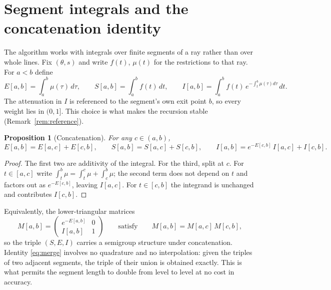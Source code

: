 \documentclass[11pt]{article}
\newtheorem{proposition}{Proposition}
\begin{document}
\section{Segment integrals and the concatenation identity}
\label{sec:identity}

The algorithm works with integrals over finite segments of a ray rather than
over whole lines. Fix $(\theta,s)$ and write $f(t)$, $\mu(t)$ for the
restrictions to that ray. For $a<b$ define
\begin{equation}
  E[a,b]=\int_a^b\mu(\tau)\,d\tau,\qquad
  S[a,b]=\int_a^b f(t)\,dt,\qquad
  I[a,b]=\int_a^b f(t)\,e^{-\int_t^b\mu(\tau)d\tau}\,dt .
  \label{eq:triple}
\end{equation}
The attenuation in $I$ is referenced to the segment's own exit point $b$, so
every weight lies in $(0,1]$. This choice is what makes the recursion stable
(Remark~\ref{rem:reference}).

\begin{proposition}[Concatenation]
\label{prop:merge}
For any $c\in(a,b)$,
\begin{equation}
  E[a,b]=E[a,c]+E[c,b],\qquad
  S[a,b]=S[a,c]+S[c,b],\qquad
  I[a,b]=e^{-E[c,b]}\,I[a,c]+I[c,b].
  \label{eq:merge}
\end{equation}
\end{proposition}

\begin{proof}
The first two are additivity of the integral. For the third, split at $c$. For
$t\in[a,c]$ write $\int_t^b\mu=\int_t^c\mu+\int_c^b\mu$; the second term does
not depend on $t$ and factors out as $e^{-E[c,b]}$, leaving $I[a,c]$. For
$t\in[c,b]$ the integrand is unchanged and contributes $I[c,b]$.
\end{proof}

Equivalently, the lower-triangular matrices
\begin{equation}
  M[a,b]=\begin{pmatrix} e^{-E[a,b]} & 0\\ I[a,b] & 1\end{pmatrix}
  \qquad\text{satisfy}\qquad
  M[a,b]=M[a,c]\,M[c,b],
\end{equation}
so the triple $(S,E,I)$ carries a semigroup structure under concatenation.
Identity \eqref{eq:merge} involves no quadrature and no interpolation: given
the triples of two adjacent segments, the triple of their union is obtained
exactly. This is what permits the segment length to double from level to level
at no cost in accuracy.
\end{document}
